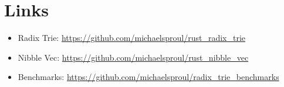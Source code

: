 \documentclass[a4paper,12pt]{article}
\begin{document}
\section{Links}

\begin{itemize}
\item Radix Trie: \url{https://github.com/michaelsproul/rust_radix_trie}
\item Nibble Vec: \url{https://github.com/michaelsproul/rust_nibble_vec}
\item Benchmarks: \url{https://github.com/michaelsproul/radix_trie_benchmarks}
\end{itemize}



\end{document}
